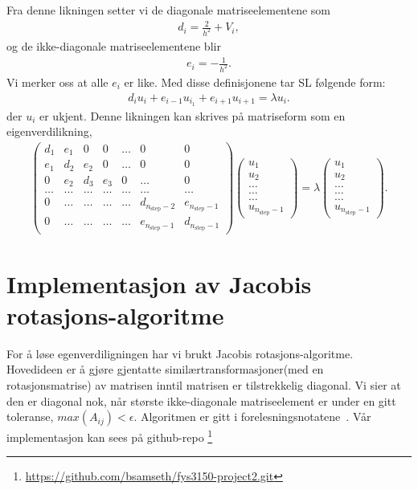 \documentclass[11pt]{article}
\begin{document}
Fra denne likningen setter vi de diagonale matriseelementene som 
\begin{align*}
  d_i = \frac{ 2 }{ h^2 } + V_i,
\end{align*}
og de ikke-diagonale matriseelementene blir 
\begin{align*}
  e_i = -\frac{ 1 }{ h^2 }.
\end{align*}
Vi merker oss at alle $e_i$ er like. Med disse definisjonene tar SL
følgende form:
\begin{align*}
  d_iu_i + e_{i-1}u_{i_1} + e_{i+1}u_{i+1} = \lambda u_i.
\end{align*}
der $u_i$ er ukjent. Denne likningen kan skrives på matriseform som
en eigenverdilikning,
\begin{align}
  \left(\begin{array}{ccccccc}
      d_1 & e_1 & 0 & 0 & \dots & 0 & 0\\
      e_1& d_2 & e_2 & 0 & \dots & 0 & 0\\
      0  & e_2 & d_3 & e_3 & 0 & \dots & 0\\
      \dots & \dots & \dots & \dots & \dots & \dots & \dots\\
      0 & \dots & \dots & \dots & \dots & d_{n_\text{step}-2} & e_{n_\text{step}-1}\\
      0 & \dots & \dots & \dots & \dots & e_{n_\text{step}-1} & d_{n_\text{step}-1}
    \end{array}\right)
    \left(\begin{array}{c}
        u_1\\
        u_2\\
        \dots\\
        \dots\\
        \dots\\
        u_{n_\text{step}-1}
      \end{array}\right) = 
     \lambda 
    \left(\begin{array}{c}
        u_1\\
        u_2\\
        \dots\\
        \dots\\
        \dots\\
        u_{n_\text{step}-1}
      \end{array}\right)\label{eq:SL-matrix}.
\end{align}

\section{Implementasjon av Jacobis rotasjons-algoritme}
For å løse egenverdiligningen har vi brukt Jacobis rotasjons-algoritme. 
Hovedideen er å gjøre gjentatte similærtransformasjoner(med en rotasjonsmatrise) av 
matrisen inntil matrisen er tilstrekkelig diagonal. Vi sier at den er diagonal nok, når største 
ikke-diagonale matriseelement er under en gitt toleranse,  $ max(A_{ij}) < \epsilon$. Algoritmen er gitt
i forelesningsnotatene~\cite[seksjon 7.4, side 215]{Lecture-notes}. Vår implementasjon kan sees på github-repo \footnote{\url{https://github.com/bsamseth/fys3150-project2.git}}
\end{document}
